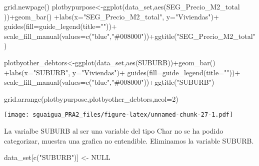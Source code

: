 \documentclass[
]{article}
\newenvironment{Shaded}{\begin{snugshade}}{\end{snugshade}}
\newcommand{\AttributeTok}[1]{\textcolor[rgb]{0.77,0.63,0.00}{#1}}
\newcommand{\ConstantTok}[1]{\textcolor[rgb]{0.00,0.00,0.00}{#1}}
\newcommand{\DecValTok}[1]{\textcolor[rgb]{0.00,0.00,0.81}{#1}}
\newcommand{\FunctionTok}[1]{\textcolor[rgb]{0.00,0.00,0.00}{#1}}
\newcommand{\NormalTok}[1]{#1}
\newcommand{\OtherTok}[1]{\textcolor[rgb]{0.56,0.35,0.01}{#1}}
\newcommand{\SpecialCharTok}[1]{\textcolor[rgb]{0.00,0.00,0.00}{#1}}
\newcommand{\StringTok}[1]{\textcolor[rgb]{0.31,0.60,0.02}{#1}}
\begin{document}
\begin{Shaded}
\begin{Highlighting}[]
\FunctionTok{grid.newpage}\NormalTok{()}
\NormalTok{plotbypurpose}\OtherTok{\textless{}{-}}\FunctionTok{ggplot}\NormalTok{(data\_set,}\FunctionTok{aes}\NormalTok{(SEG\_Precio\_M2\_total ))}\SpecialCharTok{+}\FunctionTok{geom\_bar}\NormalTok{() }\SpecialCharTok{+}\FunctionTok{labs}\NormalTok{(}\AttributeTok{x=}\StringTok{"SEG\_Precio\_M2\_total"}\NormalTok{, }\AttributeTok{y=}\StringTok{"Viviendas"}\NormalTok{)}\SpecialCharTok{+} \FunctionTok{guides}\NormalTok{(}\AttributeTok{fill=}\FunctionTok{guide\_legend}\NormalTok{(}\AttributeTok{title=}\StringTok{""}\NormalTok{))}\SpecialCharTok{+} \FunctionTok{scale\_fill\_manual}\NormalTok{(}\AttributeTok{values=}\FunctionTok{c}\NormalTok{(}\StringTok{"blue"}\NormalTok{,}\StringTok{"\#008000"}\NormalTok{))}\SpecialCharTok{+}\FunctionTok{ggtitle}\NormalTok{(}\StringTok{"SEG\_Precio\_M2\_total"}\NormalTok{)}

\NormalTok{plotbyother\_debtors}\OtherTok{\textless{}{-}}\FunctionTok{ggplot}\NormalTok{(data\_set,}\FunctionTok{aes}\NormalTok{(SUBURB))}\SpecialCharTok{+}\FunctionTok{geom\_bar}\NormalTok{() }\SpecialCharTok{+}\FunctionTok{labs}\NormalTok{(}\AttributeTok{x=}\StringTok{"SUBURB"}\NormalTok{, }\AttributeTok{y=}\StringTok{"Viviendas"}\NormalTok{)}\SpecialCharTok{+} \FunctionTok{guides}\NormalTok{(}\AttributeTok{fill=}\FunctionTok{guide\_legend}\NormalTok{(}\AttributeTok{title=}\StringTok{""}\NormalTok{))}\SpecialCharTok{+} \FunctionTok{scale\_fill\_manual}\NormalTok{(}\AttributeTok{values=}\FunctionTok{c}\NormalTok{(}\StringTok{"blue"}\NormalTok{,}\StringTok{"\#008000"}\NormalTok{))}\SpecialCharTok{+}\FunctionTok{ggtitle}\NormalTok{(}\StringTok{"SUBURB"}\NormalTok{)}

\FunctionTok{grid.arrange}\NormalTok{(plotbypurpose,plotbyother\_debtors,}\AttributeTok{ncol=}\DecValTok{2}\NormalTok{)}
\end{Highlighting}
\end{Shaded}

\texttt{[image: sguaigua\_PRA2\_files/figure-latex/unnamed-chunk-27-1.pdf]}

La varialbe SUBURB al ser una variable del tipo Char no se ha podido
categorizar, muestra una grafica no entendible. Eliminamos la variable
SUBURB.

\begin{Shaded}
\begin{Highlighting}[]
\NormalTok{data\_set[}\FunctionTok{c}\NormalTok{(}\StringTok{"SUBURB"}\NormalTok{)] }\OtherTok{\textless{}{-}} \ConstantTok{NULL}
\end{Highlighting}
\end{Shaded}
\end{document}
